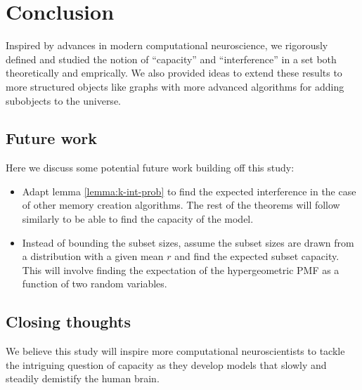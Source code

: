 \chapter{Conclusion}

Inspired by advances in modern computational neuroscience, we rigorously defined and studied the notion of ``capacity'' and ``interference'' in a set both theoretically and emprically. We also provided ideas to extend these results to more structured objects like graphs with more advanced algorithms for adding subobjects to the universe.

\section{Future work}

Here we discuss some potential future work building off this study:

\begin{itemize}
    \item Adapt lemma \ref{lemma:k-int-prob} to find the expected interference in the case of other memory creation algorithms. The rest of the theorems will follow similarly to be able to find the capacity of the model. 
    \item Instead of bounding the subset sizes, assume the subset sizes are drawn from a distribution with a given mean $r$ and find the expected subset capacity. This will involve finding the expectation of the hypergeometric PMF as a function of two random variables. 
\end{itemize}

\section{Closing thoughts}

We believe this study will inspire more computational neuroscientists to tackle the intriguing question of capacity as they develop models that slowly and steadily demistify the human brain. 
